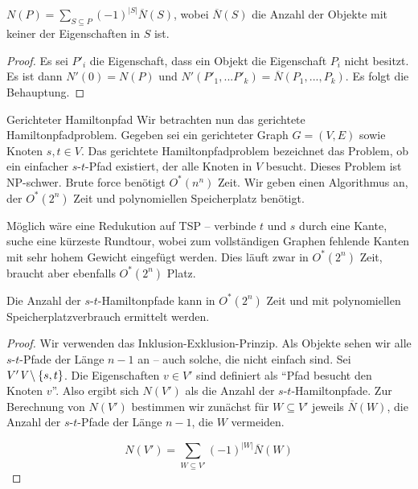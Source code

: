   \begin{corollary}
    \(N(P) = \sum_{S \subseteq P} (-1)^{|S|}\overline{N}(S)\), wobei \(\overline{N}(S)\) die Anzahl der Objekte mit keiner der Eigenschaften in \(S\) ist.
  \end{corollary}
  
  \begin{proof}
    Es sei \(P'_i\) die Eigenschaft, dass ein Objekt die Eigenschaft \(P_i\) nicht besitzt. Es ist dann \(N'(0) = N(P)\) und \(N'(P'_1, ... P'_k) = \overline{N}(P_1,...,P_k)\). Es folgt die Behauptung.
  \end{proof}
  
\begin{section}{Gerichteter Hamiltonpfad}
  Wir betrachten nun das gerichtete Hamiltonpfadproblem. Gegeben sei ein gerichteter Graph \(G = (V,E)\) sowie Knoten \(s,t \in V\). Das gerichtete Hamiltonpfadproblem bezeichnet das Problem, ob ein einfacher \(s\)-\(t\)-Pfad existiert, der alle Knoten in \(V\) besucht. Dieses Problem ist NP-schwer. Brute force benötigt \(O^*(n^n)\) Zeit. Wir geben einen Algorithmus an, der \(O^*(2^n)\) Zeit und polynomiellen Speicherplatz benötigt.
  
  Möglich wäre eine Redukution auf TSP -- verbinde $t$ und $s$ durch eine Kante, suche eine kürzeste Rundtour, wobei zum vollständigen Graphen fehlende Kanten mit sehr hohem Gewicht eingefügt werden. Dies läuft zwar in $O^*(2^n)$ Zeit, braucht aber ebenfalls $O^*(2^n)$ Platz.
  
  \begin{theorem}
    Die Anzahl der \(s\)-\(t\)-Hamiltonpfade kann in \(O^*(2^n)\) Zeit und mit polynomiellen Speicherplatzverbrauch ermittelt werden.
  \end{theorem}
  
  \begin{proof}
    Wir verwenden das Inklusion-Exklusion-Prinzip. Als Objekte sehen wir alle \(s\)-\(t\)-Pfade der Länge \(n - 1\) an -- auch solche, die nicht einfach sind. Sei $V' \emph{V} \setminus \{s,t\}$. Die Eigenschaften \(v \in V'\) sind definiert als "`Pfad besucht den Knoten \(v\)"'. Also ergibt sich \(N(V')\) als die Anzahl der \(s\)-\(t\)-Hamiltonpfade. Zur Berechnung von \(N(V')\) bestimmen wir zunächst für \(W \subseteq V'\) jeweils \(\overline{N}(W)\), die Anzahl der \(s\)-\(t\)-Pfade der Länge \(n - 1\), die \(W\) vermeiden. 
    
    \[N(V') = \sum_{W \subseteq V'} (-1)^{|W|} \overline{N}(W)\]
    

\end{proof}
\end{section}
